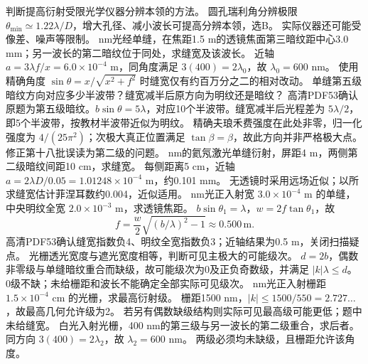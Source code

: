 \problemtext 判断提高衍射受限光学仪器分辨本领的方法。
\workings 圆孔瑞利角分辨极限 $\theta_{\min}\simeq1.22\lambda/D$，增大孔径、减小波长可提高分辨本领，选B。
\crosscheck 实际仪器还可能受像差、噪声等限制。
 nm光经单缝，在焦距1.5 m的透镜焦面第三暗纹距中心3.0 mm；另一波长的第二暗纹位于同处，求缝宽及该波长。
\workings 近轴 $a=3\lambda f/x=6.0\times10^{-4}$ m，同角度满足 $3(400)=2\lambda_0$，故 $\lambda_0=600$ nm。
\crosscheck 使用精确角度 $\sin\theta=x/\sqrt{x^2+f^2}$ 时缝宽仅有约百万分之二的相对改动。
\problemtext 单缝第五级暗纹方向对应多少半波带？缝宽减半后原方向为明纹还是暗纹？
\workings 高清PDF53确认原题为第五级暗纹。$b\sin\theta=5\lambda$，对应10个半波带。缝宽减半后光程差为 $5\lambda/2$，即5个半波带，按教材半波带近似为明纹。
\crosscheck 精确夫琅禾费强度在此处非零，归一化强度为 $4/(25\pi^2)$；次极大真正位置满足 $\tan\beta=\beta$，故此方向并非严格极大点。修正第十八批误读为第二级的问题。
 nm的氦氖激光单缝衍射，屏距4 m，两侧第二级暗纹间距10 cm，求缝宽。
\workings 每侧距离5 cm，近轴 $a=2\lambda D/0.05=1.01248\times10^{-4}$ m，约0.101 mm。
\crosscheck 无透镜时采用远场近似；以所求缝宽估计菲涅耳数约0.004，近似适用。
 nm光正入射宽 $3.0\times10^{-4}$ m 的单缝，中央明纹全宽 $2.0\times10^{-3}$ m，求透镜焦距。
\workings $b\sin\theta_1=\lambda$，$w=2f\tan\theta_1$，故
\[
f=\frac w2\sqrt{(b/\lambda)^2-1}\approx0.500\,\mathrm m.
\]
\crosscheck 高清PDF53确认缝宽指数负4、明纹全宽指数负3；近轴结果为0.5 m，关闭扫描疑点。
\problemtext 光栅透光宽度与遮光宽度相等，判断可见主极大的可能级次。
\workings $d=2b$，偶数非零级与单缝暗纹重合而缺级，故可能级次为0及正负奇数级，并满足 $|k|\lambda\le d$。
\crosscheck 0级不缺；未给栅距和波长不能确定全部实际可见级次。
 nm光正入射栅距 $1.5\times10^{-4}$ cm 的光栅，求最高衍射级。
\workings 栅距1500 nm，$|k|\le1500/550=2.727\ldots$，故最高几何允许级为2。
\crosscheck 若另有偶数缺级结构则实际可见最高级可能更低；题中未给缝宽。
\problemtext 白光入射光栅，400 nm的第三级与另一波长的第二级重合，求后者。
\workings 同方向 $3(400)=2\lambda_2$，故 $\lambda_2=600$ nm。
\crosscheck 两级必须均未缺级，且栅距允许该角度。

